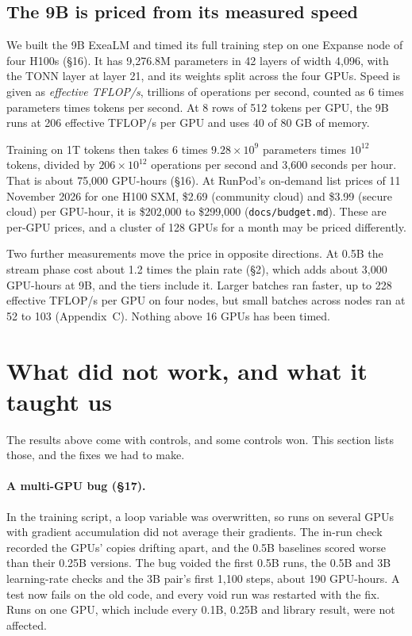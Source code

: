 \documentclass[11pt,letterpaper]{article}
\newcommand{\sect}[1]{\S#1}
\begin{document}
\subsection{The 9B is priced from its measured speed}

We built the 9B ExeaLM and timed its full training step on one Expanse node of four H100s (\sect{16}).
It has 9,276.8M parameters in 42 layers of width 4,096, with the TONN layer at layer 21, and its weights split across the four GPUs.
Speed is given as \emph{effective TFLOP/s}, trillions of operations per second, counted as 6 times parameters times tokens per second.
At 8 rows of 512 tokens per GPU, the 9B runs at 206 effective TFLOP/s per GPU and uses 40 of 80 GB of memory.

Training on 1T tokens then takes 6 times $9.28\times10^{9}$ parameters times $10^{12}$ tokens, divided by $206\times10^{12}$ operations per second and 3,600 seconds per hour.
That is about 75,000 GPU-hours (\sect{16}).
At RunPod's on-demand list prices of 11 November 2026 for one H100 SXM, \$2.69 (community cloud) and \$3.99 (secure cloud) per GPU-hour, it is \$202,000 to \$299,000 (\texttt{docs/budget.md}).
These are per-GPU prices, and a cluster of 128 GPUs for a month may be priced differently.

Two further measurements move the price in opposite directions.
At 0.5B the stream phase cost about 1.2 times the plain rate (\sect{2}), which adds about 3,000 GPU-hours at 9B, and the tiers include it.
Larger batches ran faster, up to 228 effective TFLOP/s per GPU on four nodes, but small batches across nodes ran at 52 to 103 (Appendix~C).
Nothing above 16 GPUs has been timed.

\section{What did not work, and what it taught us}

The results above come with controls, and some controls won.
This section lists those, and the fixes we had to make.

\paragraph{A multi-GPU bug (\sect{17}).}
In the training script, a loop variable was overwritten, so runs on several GPUs with gradient accumulation did not average their gradients.
The in-run check recorded the GPUs' copies drifting apart, and the 0.5B baselines scored worse than their 0.25B versions.
The bug voided the first 0.5B runs, the 0.5B and 3B learning-rate checks and the 3B pair's first 1,100 steps, about 190 GPU-hours.
A test now fails on the old code, and every void run was restarted with the fix.
Runs on one GPU, which include every 0.1B, 0.25B and library result, were not affected.
\end{document}
